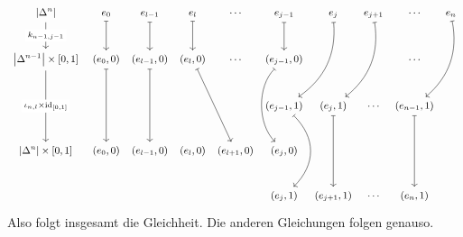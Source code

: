 	\[
		\begin{tikzcd}[row sep=2.4em, column sep=0.2em, font=\small]
			\abs*{\Delta^n} \dar["k_{n-1,j-1}" description] && e_0 \dar[mapsto] & e_{l-1} \dar[mapsto] & e_l \dar[mapsto]& \cdots 
			& e_{j-1} \dar[mapsto]& e_j \arrow[ddl,bend left,mapsto]& e_{j+1} \arrow[ddl,bend left,mapsto] & \cdots & e_n \arrow[ddl,mapsto,bend left] \\
			\abs*{\Delta^{n-1}} \times [0,1] \arrow[dd,"\iota_{n,l}\times \id_{[0,1]}" description] && (e_0,0) \arrow[dd,mapsto] & (e_{l-1},0) \arrow[dd,mapsto] 
			& (e_l,0) \arrow[ddr, mapsto] & \cdots & (e_{j-1},0) \arrow[dd, controls={+(225:1.2) and +(135:1.2)}, mapsto] &   &  & \cdots \\
			 &&&&&& (e_{j-1},1) \arrow[dd, controls={+(-45:1) and +(45:1)}, end anchor={[xshift=2ex]north}, mapsto] & (e_{j},1) \arrow[dd, mapsto] & \cdots 
			 & (e_{n-1},1) \arrow[dd,mapsto]\\
			 \abs*{\Delta^n} \times [0,1] && (e_0,0)  & (e_{l-1},0) & (e_l,0) & (e_{l+1},0) &(e_j,0) & & & \\
			 &&&&&& (e_j,1) & (e_{j+1},1) & \cdots & (e_n,1)
		\end{tikzcd}
	\]
	Also folgt insgesamt die Gleichheit. Die anderen Gleichungen folgen genauso. \bewende

